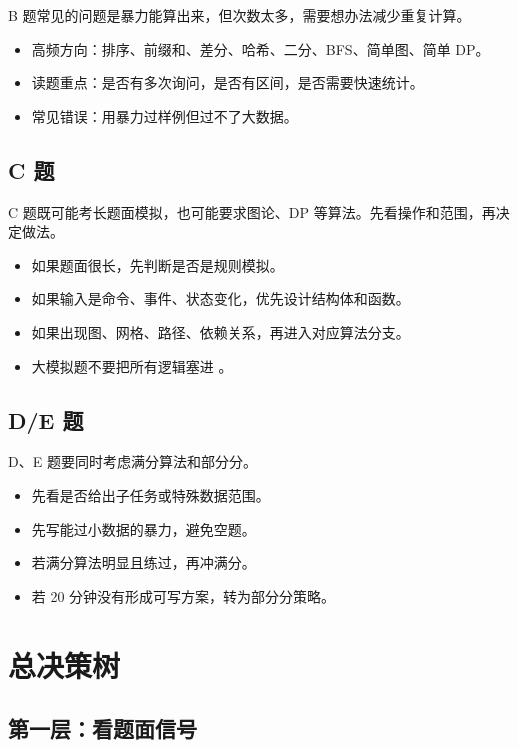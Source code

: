 B 题常见的问题是暴力能算出来，但次数太多，需要想办法减少重复计算。

\begin{itemize}
  \item 高频方向：排序、前缀和、差分、哈希、二分、BFS、简单图、简单 DP。
  \item 读题重点：是否有多次询问，是否有区间，是否需要快速统计。
  \item 常见错误：用暴力过样例但过不了大数据。
\end{itemize}

\subsection{C 题}

C 题既可能考长题面模拟，也可能要求图论、DP 等算法。先看操作和范围，再决定做法。

\begin{itemize}
  \item 如果题面很长，先判断是否是规则模拟。
  \item 如果输入是命令、事件、状态变化，优先设计结构体和函数。
  \item 如果出现图、网格、路径、依赖关系，再进入对应算法分支。
  \item 大模拟题不要把所有逻辑塞进 。
\end{itemize}

\subsection{D/E 题}

D、E 题要同时考虑满分算法和部分分。

\begin{itemize}
  \item 先看是否给出子任务或特殊数据范围。
  \item 先写能过小数据的暴力，避免空题。
  \item 若满分算法明显且练过，再冲满分。
  \item 若 20 分钟没有形成可写方案，转为部分分策略。
\end{itemize}

\section{总决策树}\label{sec:01-7}

\subsection{第一层：看题面信号}

